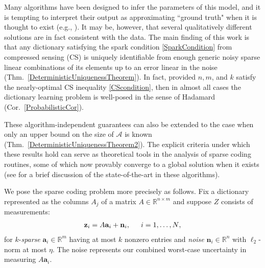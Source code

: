 \documentclass[journal, twocolumn]{IEEEtran}
\begin{document}
Many algorithms have been designed to infer the parameters of this model, and it is tempting to interpret their output as approximating ``ground truth" when it is thought to exist (e.g., \cite{Olshausen10}). It may be, however, that several qualitatively different solutions are in fact consistent with the data. The main finding of this work is that any dictionary satisfying the spark condition \eqref{SparkCondition} from compressed sensing (CS) is uniquely identifiable from enough generic noisy sparse linear combinations of its elements up to an error linear in the noise (Thm.~\ref{DeterministicUniquenessTheorem}). In fact, provided $n, m$, and $k$ satisfy the nearly-optimal CS inequality \eqref{CScondition}, then in almost all cases the dictionary learning problem is well-posed in the sense of Hadamard \cite{Hadamard1902} (Cor.~\ref{ProbabilisticCor}). 

These algorithm-independent guarantees can also be extended to the case when only an upper bound on the size of $\mathcal{A}$ is known (Thm.~\ref{DeterministicUniquenessTheorem2}). The explicit criteria under which these results hold can serve as theoretical tools in the analysis of sparse coding routines, some of which now provably converge to a global solution when it exists (see \cite[Sec.~I-E]{Sun16} for a brief discussion of the state-of-the-art in these algorithms). 


We pose the sparse coding problem more precisely as follows. Fix a dictionary represented as the columns $A_j$ of a matrix $A \in \mathbb R^{n \times m}$ and suppose $Z$ consists of measurements:
\begin{align}\label{LinearModel}
\mathbf{z}_i = A\mathbf{a}_i + \mathbf{n}_i,\indent \text{$i=1,\ldots,N$},
\end{align}
for $k$-\emph{sparse} $\mathbf{a}_i \in \mathbb{R}^m$ having at most $k$ nonzero entries and \emph{noise} $\mathbf{n}_i \in \mathbb{R}^n$ with $\ell_2$-norm at most $\eta$. The noise represents our combined worst-case uncertainty in  measuring $A\mathbf{a}_i$.
\end{document}

